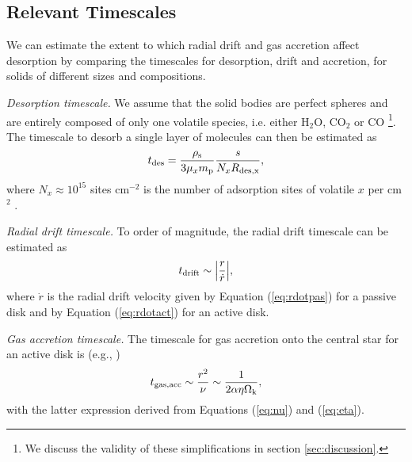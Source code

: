 \documentclass[apj]{emulateapj}
\newcommand{\emgr}[1]{\emph{ \color{gray} #1}}
\begin{document}

\subsection{Relevant Timescales}
\label{sec:timescales}

We can estimate the extent to which radial drift and gas accretion affect desorption by comparing the timescales for desorption, drift and accretion, for solids of different sizes and compositions. 

\textit{Desorption timescale.} We assume that the solid bodies are perfect spheres and are entirely composed of only one volatile species, i.e. either H$_2$O, CO$_2$ or CO \footnote{We discuss the validity of these simplifications in section \ref{sec:discussion}.}. The timescale to desorb a single layer of molecules can then be estimated as
\begin{equation}
\label{eq:tdes}
t_{\rm des}=\frac{\rho_{\rm s}}{3 \mu_x m_{\rm p}} \frac{s}{N_x R_{\rm des, x}},
\end{equation}
where $N_x \approx 10^{15}$ sites cm$^{-2}$ is the number of adsorption sites of volatile $x$ per cm$^2$ \citep{hollenbach09}. 

\textit{Radial drift timescale.} To order of magnitude, the radial drift timescale can be estimated as 
\begin{equation}
\label{eq:tdrift}
t_{\rm drift} \sim \Big|\frac{r}{\dot{r}}\Big|,
\end{equation}
where $\dot{r}$ is the radial drift velocity given by Equation (\ref{eq:rdotpas}) for a passive disk and by Equation (\ref{eq:rdotact}) for an active disk.

\textit{Gas accretion timescale.} The timescale for gas accretion onto the central star for an active disk is (e.g., \citealt{armitage10})
\begin{equation}
\label{eq:tgas}
t_{\rm gas, acc} \sim \frac{r^2}{\nu} \sim \frac{1}{2 \alpha \eta \Omega_{\rm k}},
\end{equation}
with the latter expression derived from Equations (\ref{eq:nu}) and (\ref{eq:eta}).
\end{document}
